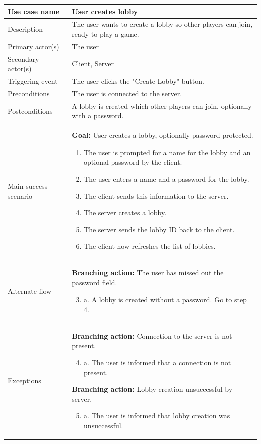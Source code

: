 \documentclass[12pt]{article}
\begin{document}
$$$$
\begin{tabularx}{\textwidth}{|l|X|} \hline
Use case name & \textbf{User creates lobby}\\ \hline
Description & The user wants to create a lobby so other players can join, ready to play a game. \\ \hline
Primary actor(s) & The user \\ \hline
Secondary actor(s) & Client, Server \\ \hline
Triggering event & The user clicks the "Create Lobby" button. \\ \hline
Preconditions & The user is connected to the server. \\ \hline
Postconditions & A lobby is created which other players can join, optionally with a password. \\ \hline
Main success scenario & 
\textbf{Goal:} User creates a lobby, optionally password-protected.
\begin{enumerate}[noitemsep,topsep=0px]
	\item The user is prompted for a name for the lobby and an optional password by the client. 
	\item The user enters a name and a password for the lobby.
	\item The client sends this information to the server.
	\item The server creates a lobby.
	\item The server sends the lobby ID back to the client.
	\item The client now refreshes the list of lobbies.
\end{enumerate} \\ \hline
Alternate flow & 
\textbf{Branching action:} The user has missed out the password field. 
\begin{enumerate}[noitemsep,topsep=0px,label={\arabic*}]
	\setcounter{enumi}{2} %
	\item a. A lobby is created without a password. Go to step 4.
\end{enumerate}
\\ \hline
Exceptions &  
\textbf{Branching action:} Connection to the server is not present. 
\begin{enumerate}[noitemsep,topsep=0px,label={\arabic*}]
	\setcounter{enumi}{3} %
	\item a. The user is informed that a connection is not present.
\end{enumerate}
\textbf{Branching action:} 	Lobby creation unsuccessful by server. 
\begin{enumerate}[noitemsep,topsep=0px,label={\arabic*}]
	\setcounter{enumi}{4} %
	\item a. The user is informed that lobby creation was unsuccessful.
\end{enumerate} \\ \hline
\end{tabularx}
\end{document}
